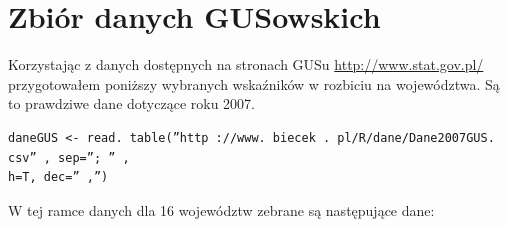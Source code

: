 \documentclass[polish,]{book}
\begin{document}
\hypertarget{part_14.1}{%
\section{Zbiór danych GUSowskich}\label{part_14.1}}

Korzystając z danych dostępnych na stronach GUSu \url{http://www.stat.gov.pl/}
przygotowałem poniższy wybranych wskaźników w rozbiciu na województwa. Są to
prawdziwe dane dotyczące roku 2007.

\begin{verbatim}
daneGUS <- read. table(”http ://www. biecek . pl/R/dane/Dane2007GUS. csv” , sep=”; ” ,
h=T, dec=” ,”)
\end{verbatim}

W tej ramce danych dla 16 województw zebrane są następujące dane:
\end{document}
